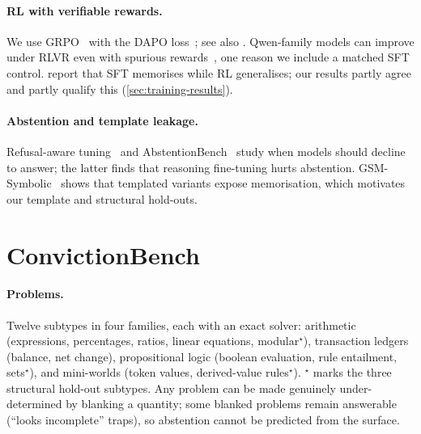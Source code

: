 \documentclass[11pt]{article}
\newcommand{\bench}{ConvictionBench}
\begin{document}
\paragraph{RL with verifiable rewards.} We use GRPO~\citep{shao2024deepseekmath,deepseek2025r1} with the DAPO
loss~\citep{yu2025dapo}; see also \citet{lambert2024tulu3,liu2025drgrpo}. Qwen-family models can improve under RLVR
even with spurious rewards~\citep{shao2026spurious}, one reason we include a matched SFT control. \citet{chu2025sft}
report that SFT memorises while RL generalises; our results partly agree and partly qualify this
(\cref{sec:training-results}).

\paragraph{Abstention and template leakage.} Refusal-aware tuning~\citep{zhang2024rtuning} and
AbstentionBench~\citep{kirichenko2025abstention} study when models should decline to answer; the latter finds that
reasoning fine-tuning hurts abstention. GSM-Symbolic~\citep{mirzadeh2024gsmsymbolic} shows that templated variants
expose memorisation, which motivates our template and structural hold-outs.

\section{\bench{}}
\label{sec:bench}

\paragraph{Problems.} Twelve subtypes in four families, each with an exact solver: arithmetic (expressions,
percentages, ratios, linear equations, modular$^\star$), transaction ledgers (balance, net change), propositional
logic (boolean evaluation, rule entailment, sets$^\star$), and mini-worlds (token values, derived-value
rules$^\star$). $^\star$ marks the three structural hold-out subtypes. Any problem can be made genuinely
under-determined by blanking a quantity; some blanked problems remain answerable (``looks incomplete'' traps), so
abstention cannot be predicted from the surface.
\end{document}
